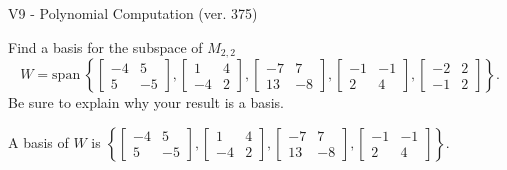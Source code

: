 \begin{exercise}
  \begin{exerciseTitle}V9 - Polynomial Computation (ver. 375)\end{exerciseTitle}
  \begin{exerciseStatement}
    Find a basis for the subspace of \(M_{2,2}\) 
\[W=\mathrm{span}\ \left\{\left[\begin{array}{cc}
-4 & 5 \\
5 & -5
\end{array}\right] , \left[\begin{array}{cc}
1 & 4 \\
-4 & 2
\end{array}\right] , \left[\begin{array}{cc}
-7 & 7 \\
13 & -8
\end{array}\right] , \left[\begin{array}{cc}
-1 & -1 \\
2 & 4
\end{array}\right] , \left[\begin{array}{cc}
-2 & 2 \\
-1 & 2
\end{array}\right]\right\}.\]
 Be sure to explain why your result is a basis.


  \end{exerciseStatement}
  \begin{exerciseAnswer}
   A basis of \(W\) is  \(\left\{\left[\begin{array}{cc}
-4 & 5 \\
5 & -5
\end{array}\right] , \left[\begin{array}{cc}
1 & 4 \\
-4 & 2
\end{array}\right] , \left[\begin{array}{cc}
-7 & 7 \\
13 & -8
\end{array}\right] , \left[\begin{array}{cc}
-1 & -1 \\
2 & 4
\end{array}\right]\right\}\).
  


  \end{exerciseAnswer}
\end{exercise}